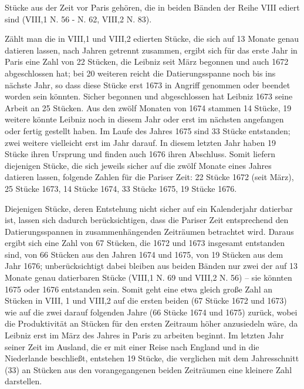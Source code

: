 \par\newpage\noindent Stücke aus der Zeit vor Paris gehören, die in beiden Bänden der Reihe VIII ediert sind (VIII,1 N. 56 - N. 62, VIII,2 N. 83).\par
Zählt man die in VIII,1 und VIII,2 edierten Stücke, die sich auf 13 Monate genau datieren lassen, nach Jahren getrennt zusammen, ergibt sich für das erste Jahr in Paris eine Zahl von 22 Stücken, die Leibniz seit März begonnen und auch 1672 abgeschlossen hat; bei 20 weiteren reicht die Datierungsspanne noch bis ins nächste Jahr, so dass diese Stücke erst 1673 in Angriff genommen oder beendet worden sein könnten. Sicher begonnen und abgeschlossen hat Leibniz 1673 seine Arbeit an 25 Stücken. Aus den zwölf Monaten von 1674 stammen 14 Stücke, 19 weitere könnte Leibniz noch in diesem Jahr oder erst im nächsten angefangen oder fertig gestellt haben. Im Laufe des Jahres 1675 sind 33 Stücke entstanden; zwei weitere vielleicht erst im Jahr darauf. In diesem letzten Jahr haben 19 Stücke ihren Ursprung und finden auch 1676 ihren Abschluss. Somit liefern diejenigen Stücke, die sich jeweils sicher auf die zwölf Monate eines Jahres datieren lassen, folgende Zahlen für die Pariser Zeit: 22 Stücke 1672 (seit März), 25 Stücke 1673, 14 Stücke 1674, 33 Stücke 1675, 19 Stücke 1676.\par 
Diejenigen Stücke, deren Entstehung nicht sicher auf ein Kalenderjahr datierbar ist, lassen sich dadurch berücksichtigen, dass die Pariser Zeit entsprechend den Datierungsspannen in zusammenhängenden Zeiträumen betrachtet wird. Daraus ergibt sich eine Zahl von 67 Stücken, die 1672 und 1673 insgesamt entstanden sind, von 66 Stücken aus den Jahren 1674 und 1675, von 19 Stücken aus dem Jahr 1676; unberücksichtigt dabei bleiben aus beiden Bänden nur zwei der auf 13 Monate genau datierbaren Stücke (VIII,1 N. 69 und VIII,2 N. 56) – sie könnten 1675 oder 1676 entstanden sein. Somit geht eine etwa gleich große Zahl an Stücken in VIII, 1 und VIII,2 auf die ersten beiden (67 Stücke 1672 und 1673) wie auf die zwei darauf folgenden Jahre (66 Stücke 1674 und 1675) zurück, wobei die Produktivität an Stücken für den ersten Zeitraum höher anzusiedeln wäre, da Leibniz erst im März des Jahres in Paris zu arbeiten beginnt. Im letzten Jahr seiner Zeit im Ausland, die er mit einer Reise nach England und in die Niederlande beschließt, entstehen 19 Stücke, die verglichen mit dem Jahresschnitt (33) an Stücken aus den vorangegangenen beiden Zeiträumen eine kleinere Zahl darstellen.\par
